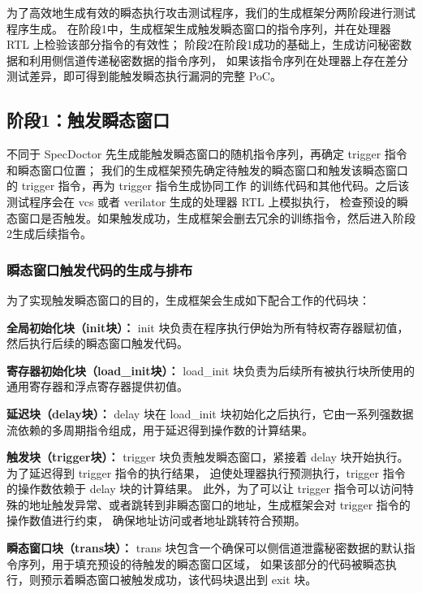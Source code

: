 为了高效地生成有效的瞬态执行攻击测试程序，我们的生成框架分两阶段进行测试程序生成。
在阶段1中，生成框架生成触发瞬态窗口的指令序列，并在处理器 RTL 上检验该部分指令的有效性；
阶段2在阶段1成功的基础上，生成访问秘密数据和利用侧信道传递秘密数据的指令序列，
如果该指令序列在处理器上存在差分测试差异，即可得到能触发瞬态执行漏洞的完整 PoC。\par

\subsection{阶段1：触发瞬态窗口}

不同于 SpecDoctor 先生成能触发瞬态窗口的随机指令序列，再确定 trigger 指令和瞬态窗口位置；
我们的生成框架预先确定待触发的瞬态窗口和触发该瞬态窗口的 trigger 指令，再为 trigger 指令生成协同工作
的训练代码和其他代码。之后该测试程序会在 vcs 或者 verilator\cite{snyder2013verilator} 生成的处理器 RTL 上模拟执行，
检查预设的瞬态窗口是否触发。如果触发成功，生成框架会删去冗余的训练指令，然后进入阶段2生成后续指令。\par

\subsubsection{瞬态窗口触发代码的生成与排布}

为了实现触发瞬态窗口的目的，生成框架会生成如下配合工作的代码块：\par

\textbf{全局初始化块（init块）：}
init 块负责在程序执行伊始为所有特权寄存器赋初值，然后执行后续的瞬态窗口触发代码。\par
\textbf{寄存器初始化块（load\_init块）：}
load\_init 块负责为后续所有被执行块所使用的通用寄存器和浮点寄存器提供初值。\par
\textbf{延迟块（delay块）：}
delay 块在 load\_init 块初始化之后执行，它由一系列强数据流依赖的多周期指令组成，用于延迟得到操作数的计算结果。\par
\textbf{触发块（trigger块）：}
trigger 块负责触发瞬态窗口，紧接着 delay 块开始执行。为了延迟得到 trigger 指令的执行结果，
迫使处理器执行预测执行，trigger 指令的操作数依赖于 delay 块的计算结果。
此外，为了可以让 trigger 指令可以访问特殊的地址触发异常、或者跳转到非瞬态窗口的地址，生成框架会对 trigger 指令的操作数值进行约束，
确保地址访问或者地址跳转符合预期。\par
\textbf{瞬态窗口块（trans块）：}
trans 块包含一个确保可以侧信道泄露秘密数据的默认指令序列，用于填充预设的待触发的瞬态窗口区域，
如果该部分的代码被瞬态执行，则预示着瞬态窗口被触发成功，该代码块退出到 exit 块。\par


